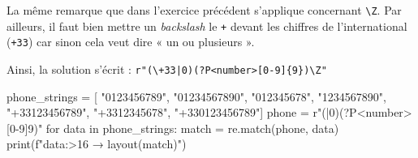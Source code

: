\vspace{2pt}

\begin{solution}
La même remarque que dans l'exercice précédent s'applique concernant \lstinline[basicstyle={\shellttfont}]{\Z}. 
Par ailleurs, il faut bien mettre un \textit{backslash} le \texttt{+} devant les chiffres de l'international (\texttt{+33}) car sinon cela veut dire « un ou plusieurs ».

Ainsi, la solution s'écrit : \texttt{r"(\textbackslash{+}33|0)(?P<number>[0-9]\{9\})\textbackslash{Z}"}

\begin{idleconsole}
	\begin{pyconsole}
phone_strings = [
    "0123456789",
    "01234567890",
    "012345678",
    "1234567890",
    "+33123456789",
    "+3312345678",
    "+330123456789"]
phone = r"(|0)(?P<number>[0-9]{9})\Z"
for data in phone_strings:
    match = re.match(phone, data)
    print(f"{data:>16} → {layout(match)}")

	\end{pyconsole}
\end{idleconsole}

\end{solution}

\vspace{2pt}

